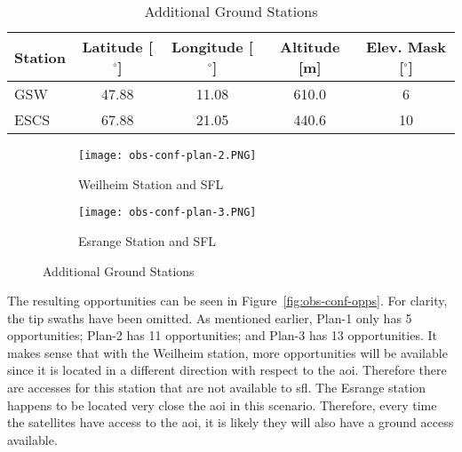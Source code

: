 \begin{table}[h] 
    \centering
    \caption{Additional Ground Stations}
    \begin{tabular}{ccccc}
	Station & Latitude [$^\circ$] & Longitude [$^\circ$] & Altitude [m] & Elev. Mask [$^\circ$] \\ \hline
	\multicolumn{1}{l|}{GSW}  & 47.88   & 11.08   & 610.0  & 6      \\
	\multicolumn{1}{l|}{ESCS} & 67.88   & 21.05   & 440.6  & 10      \\
    \end{tabular}
    \label{tab:additional-gs}
\end{table}

\begin{figure}[h]
    \centering
    \begin{subfigure}[b]{0.49\textwidth}
	\centering
	\texttt{[image: obs-conf-plan-2.PNG]} 
	\caption{Weilheim Station and SFL}
	\label{fig:obs-conf-gs-placements-1} 
    \end{subfigure}
    \hfill
    \begin{subfigure}[b]{0.49\textwidth}
	\centering
	\texttt{[image: obs-conf-plan-3.PNG]} 
	\caption{Esrange Station and SFL}
	\label{fig:obs-conf-gs-placements-2}
    \end{subfigure}
    \caption{Additional Ground Stations}
    \label{fig:obs-conf-gs-placements} 
\end{figure}

The resulting opportunities can be seen in Figure~\ref{fig:obs-conf-opps}.  For
clarity, the tip swaths have been omitted. As mentioned earlier, Plan-1 only
has 5 opportunities; Plan-2 has 11 opportunities; and Plan-3 has 13
opportunities. It makes sense that with the Weilheim station, more
opportunities will be available since it is located in a different direction
with respect to the \gls{aoi}. Therefore there are accesses for this station
that are not available to \gls{sfl}. The Esrange station happens to be located
very close the \gls{aoi} in this scenario. Therefore, every time the satellites
have access to the \gls{aoi}, it is likely they will also have a ground access
available. 

